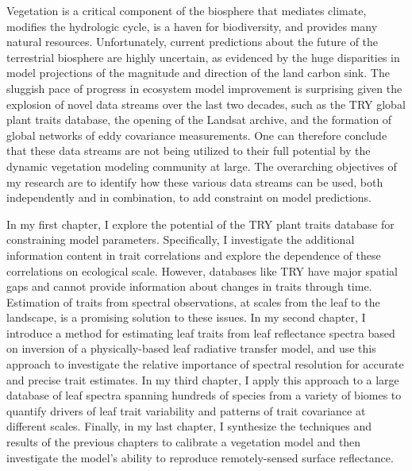 
Vegetation is a critical component of the biosphere that mediates climate, modifies the hydrologic cycle, is a haven for biodiversity, and provides many natural resources.
Unfortunately, current predictions about the future of the terrestrial biosphere are highly uncertain, as evidenced by the huge disparities in model projections of the magnitude and direction of the land carbon sink.
The sluggish pace of progress in ecosystem model improvement is surprising given the explosion of novel data streams over the last two decades, such as the TRY global plant traits database, the opening of the Landsat archive, and the formation of global networks of eddy covariance measurements.
One can therefore conclude that these data streams are not being utilized to their full potential by the dynamic vegetation modeling community at large.
The overarching objectives of my research are to identify how these various data streams can be used, both independently and in combination, to add constraint on model predictions.

In my first chapter, I explore the potential of the TRY plant traits database for constraining model parameters.
Specifically, I investigate the additional information content in trait correlations and explore the dependence of these correlations on ecological scale.
However, databases like TRY have major spatial gaps and cannot provide information about changes in traits through time.
Estimation of traits from spectral observations, at scales from the leaf to the landscape, is a promising solution to these issues.
In my second chapter, I introduce a method for estimating leaf traits from leaf reflectance spectra based on inversion of a physically-based leaf radiative transfer model, and use this approach to investigate the relative importance of spectral resolution for accurate and precise trait estimates.
In my third chapter, I apply this approach to a large database of leaf spectra spanning hundreds of species from a variety of biomes to quantify drivers of leaf trait variability and patterns of trait covariance at different scales.
Finally, in my last chapter, I synthesize the techniques and results of the previous chapters to calibrate a vegetation model and then investigate the model's ability to reproduce remotely-sensed surface reflectance.
